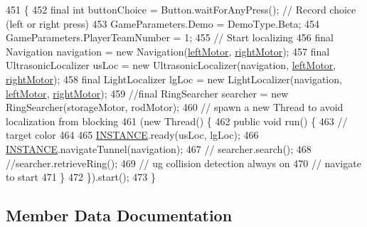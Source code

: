 \begin{DoxyCode}
451                                                   \{
452     \textcolor{keyword}{final} \textcolor{keywordtype}{int} buttonChoice = Button.waitForAnyPress(); \textcolor{comment}{// Record choice (left or right press)}
453     GameParameters.Demo = DemoType.Beta;
454     GameParameters.PlayerTeamNumber = 1;
455     \textcolor{comment}{// Start localizing}
456     \textcolor{keyword}{final} Navigation navigation = \textcolor{keyword}{new} Navigation(\hyperlink{enumca_1_1mcgill_1_1ecse211_1_1project_1_1_game_a7c673571bf50fdb6917a9d7bb671e003}{leftMotor}, \hyperlink{enumca_1_1mcgill_1_1ecse211_1_1project_1_1_game_a7a05fcf37c4435c32270776a427ba0d2}{rightMotor});
457     \textcolor{keyword}{final} UltrasonicLocalizer usLoc = \textcolor{keyword}{new} UltrasonicLocalizer(navigation, 
      \hyperlink{enumca_1_1mcgill_1_1ecse211_1_1project_1_1_game_a7c673571bf50fdb6917a9d7bb671e003}{leftMotor}, \hyperlink{enumca_1_1mcgill_1_1ecse211_1_1project_1_1_game_a7a05fcf37c4435c32270776a427ba0d2}{rightMotor});
458     \textcolor{keyword}{final} LightLocalizer lgLoc = \textcolor{keyword}{new} LightLocalizer(navigation, \hyperlink{enumca_1_1mcgill_1_1ecse211_1_1project_1_1_game_a7c673571bf50fdb6917a9d7bb671e003}{leftMotor}, 
      \hyperlink{enumca_1_1mcgill_1_1ecse211_1_1project_1_1_game_a7a05fcf37c4435c32270776a427ba0d2}{rightMotor});
459     \textcolor{comment}{//final RingSearcher searcher = new RingSearcher(storageMotor, rodMotor);}
460     \textcolor{comment}{// spawn a new Thread to avoid localization from blocking}
461     (\textcolor{keyword}{new} Thread() \{
462       \textcolor{keyword}{public} \textcolor{keywordtype}{void} run() \{
463         \textcolor{comment}{// target color}
464 
465         \hyperlink{enumca_1_1mcgill_1_1ecse211_1_1project_1_1_game_a6584b6534b14ba43dc1444084a925a20}{INSTANCE}.ready(usLoc, lgLoc);
466         \hyperlink{enumca_1_1mcgill_1_1ecse211_1_1project_1_1_game_a6584b6534b14ba43dc1444084a925a20}{INSTANCE}.navigateTunnel(navigation);
467        \textcolor{comment}{// searcher.search();}
468         \textcolor{comment}{//searcher.retrieveRing();}
469         \textcolor{comment}{// ug collision detection always on}
470         \textcolor{comment}{// navigate to start}
471       \}
472     \}).start();
473   \}
\end{DoxyCode}


\subsection{Member Data Documentation}
\mbox{\label{enumca_1_1mcgill_1_1ecse211_1_1project_1_1_game_a7c673571bf50fdb6917a9d7bb671e003}} 
